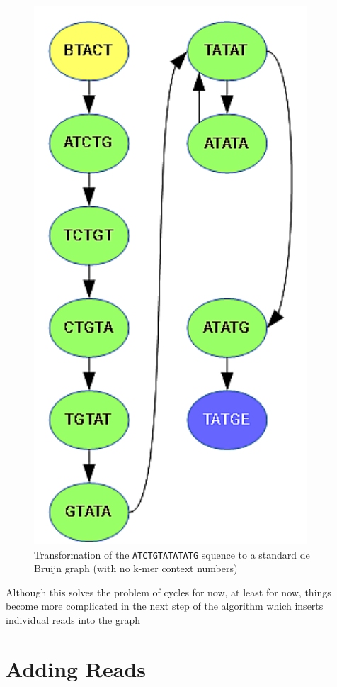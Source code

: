 \begin{figure}[h]
	\centering
	\includegraphics{img/ref-db.pdf}
	\caption{Transformation of the \texttt{ATCTGTATATATG} squence to a standard de Bruijn graph (with no k-mer context numbers)}
	\label{fig:ref-db}
\end{figure}

Although this solves the problem of cycles for now, at least for now, things become more complicated in the next step of the algorithm which inserts individual reads into the graph

\section{Adding Reads}
\label{sec:adding-reads}


